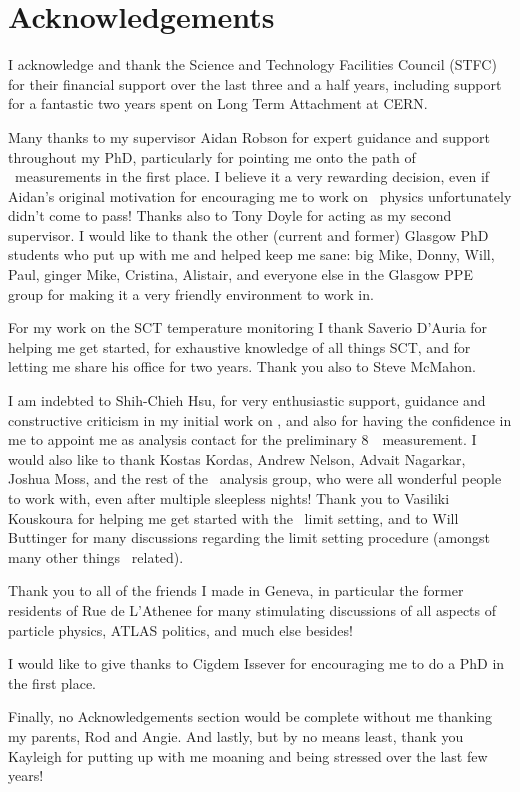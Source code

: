 \chapter*{Acknowledgements}
I acknowledge and thank the Science and Technology Facilities Council
(STFC) for their financial support over the last three and a half years,
including support for a fantastic two years spent on Long Term Attachment at CERN.

Many thanks to my supervisor Aidan Robson for expert guidance and support throughout my
PhD, particularly for pointing me onto the path of \ZZ\ measurements in the first
place. I believe it a very rewarding decision, even if Aidan's original
motivation for encouraging me to work on \ZZ\ physics unfortunately didn't come to
pass! 
Thanks also to Tony
Doyle for acting as my second supervisor.
I would like to thank the other (current and former) Glasgow PhD students who put up with me and
helped keep me sane: big Mike, Donny, Will, Paul, ginger Mike, Cristina,
Alistair, and everyone else in the Glasgow PPE group for making it a very
friendly environment to work in.

For my work on the SCT temperature monitoring I thank Saverio D'Auria
for helping me get started, for exhaustive knowledge of all things SCT, and for
letting me share his office for two years. Thank you also to Steve McMahon.

I am indebted to Shih-Chieh Hsu, for very enthusiastic
support, guidance and constructive criticism in my initial work on \ZZ, and
also for having the confidence in me to appoint me as analysis contact for the
preliminary 8~\tev\ measurement. I would also like to thank Kostas Kordas,
Andrew Nelson, Advait Nagarkar, Joshua Moss, and the rest of the \ZZ\ analysis
group, who were all wonderful people to work with, even after multiple sleepless
nights! Thank you to Vasiliki Kouskoura for helping me get started with the
\TGC\ limit setting, and to Will Buttinger for many discussions regarding the
limit setting procedure (amongst many other things \ZZ\ related).

Thank you to all of the friends I made in Geneva, in particular the former
residents of Rue de L'Athenee for many stimulating discussions of all aspects of
particle physics, ATLAS politics, and much else besides!

I would like to give thanks to Cigdem Issever for encouraging me to do a PhD in the first
place. 

Finally, no Acknowledgements section would be complete without me
thanking my parents, Rod and Angie. And lastly, but by no means least, thank you Kayleigh for putting up with
me moaning and being stressed over the last few years!

